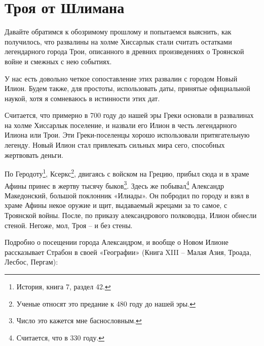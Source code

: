 \chapter{Троя от Шлимана}

Давайте обратимся к обозримому прошлому и попытаемся выяснить, как получилось, что развалины на холме Хиссарлык стали считать остатками легендарного города Трои, описанного в древних произведениях о Троянской войне и смежных с нею событиях.

У нас есть довольно четкое сопоставление этих развалин с городом Новый Илион. Будем также, для простоты, использовать даты, принятые официальной наукой, хотя я сомневаюсь в истинности этих дат.

Считается, что примерно в 700 году до нашей эры Греки основали в развалинах на холме Хиссарлык поселение, и назвали его Илион в честь легендарного Илиона или Трои. Эти Греки-поселенцы хорошо использовали притягательную легенду. Новый Илион стал привлекать сильных мира сего, способных жертвовать деньги. 

По Геродоту\footnote{История, книга 7, раздел 42.}, Ксеркс\footnote{Ученые относят это предание к 480 году до нашей эры.}, двигаясь с войском на Грецию, прибыл сюда и в храме Афины принес в жертву тысячу быков\footnote{Число это кажется мне баснословным.}. Здесь же побывал\footnote{Считается, что в 330 году.} Александр Македонский, большой поклонник «Илиады». Он побродил по городу и взял в храме Афины некое оружие и щит, выдаваемый жрецами за то самое, с Троянской войны. После, по приказу александрового полководца, Илион обнесли стеной. Негоже, мол, Троя – и без стены.

Подробно о посещении города Александром, и вообще о Новом Илионе рассказывает Страбон в своей «Географии» (Книга XIII – Малая Азия, Троада, Лесбос, Пергам)\cite{strabon01}:

